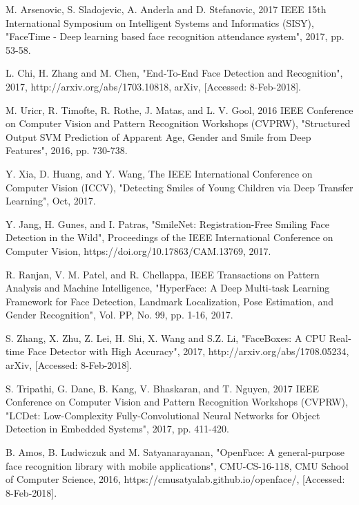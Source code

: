 \documentclass[conference]{IEEEtran}
\begin{document}
\begin{thebibliography}{00}
M. Arsenovic, S. Sladojevic, A. Anderla and D. Stefanovic, 2017 IEEE 15th International Symposium on Intelligent Systems and Informatics (SISY), "FaceTime - Deep learning based face recognition attendance system", 2017, pp. 53-58.

 L. Chi, H. Zhang and M. Chen, "End-To-End Face Detection and Recognition", 2017, http://arxiv.org/abs/1703.10818, arXiv, [Accessed: 8-Feb-2018].

M. Uricr, R. Timofte, R. Rothe, J. Matas, and L. V. Gool, 2016 IEEE Conference on Computer Vision and Pattern Recognition Workshops (CVPRW), "Structured Output SVM Prediction of Apparent Age, Gender and Smile from Deep Features", 2016, pp. 730-738.

Y. Xia, D. Huang, and Y. Wang, The IEEE International Conference on Computer Vision (ICCV), "Detecting Smiles of Young Children via Deep Transfer Learning", Oct, 2017.

 Y. Jang, H. Gunes, and I. Patras, "SmileNet: Registration-Free Smiling Face Detection in the Wild", Proceedings of the IEEE International Conference on Computer Vision, https://doi.org/10.17863/CAM.13769, 2017.

R. Ranjan, V. M. Patel, and R. Chellappa, IEEE Transactions on Pattern Analysis and Machine Intelligence, "HyperFace: A Deep Multi-task Learning Framework for Face Detection, Landmark Localization, Pose Estimation, and Gender Recognition", Vol. PP, No. 99, pp. 1-16, 2017.


 S. Zhang, X. Zhu, Z. Lei, H. Shi, X. Wang and S.Z. Li, "FaceBoxes: {A} {CPU} Real-time Face Detector with High Accuracy", 2017, http://arxiv.org/abs/1708.05234, arXiv, [Accessed: 8-Feb-2018].

S. Tripathi, G. Dane, B. Kang, V. Bhaskaran, and T. Nguyen, 2017 IEEE Conference on Computer Vision and Pattern Recognition Workshops (CVPRW), "LCDet: Low-Complexity Fully-Convolutional Neural Networks for Object Detection in Embedded Systems", 2017, pp. 411-420.

B. Amos, B. Ludwiczuk and M. Satyanarayanan, "OpenFace: A general-purpose face recognition library with mobile applications", CMU-CS-16-118, CMU School of Computer Science, 2016, https://cmusatyalab.github.io/openface/, [Accessed: 8-Feb-2018].






\end{thebibliography}
\end{document}
